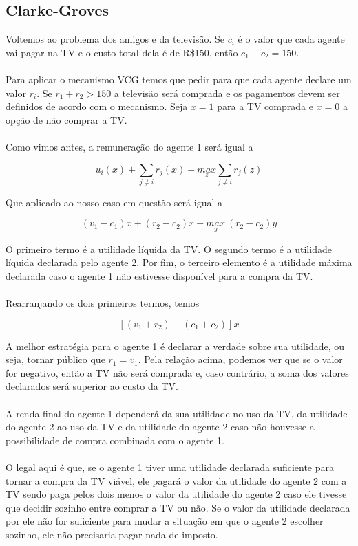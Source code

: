 \documentclass[a4paper,11pt,oneside]{book}
\theoremstyle{definition}
\theoremstyle{break}
\begin{document}
\subsection{Clarke-Groves}

Voltemos ao problema dos amigos e da televisão. Se $c_i$ é o valor que cada agente vai pagar na TV e o custo total dela é de R\$150, então $c_1 + c_2 = 150$.
\\~\\
Para aplicar o mecanismo VCG temos que pedir para que cada agente declare um valor $r_i$. Se $r_1 + r_2 > 150$ a televisão será comprada e os pagamentos devem ser definidos de acordo com o mecanismo. Seja $x=1$ para a TV comprada e $x=0$ a opção de não comprar a TV.
\\~\\
Como vimos antes, a remuneração do agente 1 será igual a 

$$ u_i(x) + \displaystyle \sum_{j \neq i} r_j(x) - \underset{z}{max} \sum_{j \neq i} r_j(z) $$

Que aplicado ao nosso caso em questão será igual a 

$$ (v_1 - c_1)x + (r_2 - c_2)x - \underset{y}{max}\ (r_2 - c_2)y $$

O primeiro termo é a utilidade líquida da TV. O segundo termo é a utilidade líquida declarada pelo agente 2. Por fim, o terceiro elemento é a utilidade máxima declarada caso o agente 1 não estivesse disponível para a compra da TV.
\\~\\
Rearranjando os dois primeiros termos, temos 

$$ [(v_1 + r_2) - (c_1 + c_2)]x $$

A melhor estratégia para o agente 1 é declarar a verdade sobre sua utilidade, ou seja, tornar público que $r_1 = v_1$. Pela relação acima, podemos ver que se o valor for negativo, então a TV não será comprada e, caso contrário, a soma dos valores declarados será superior ao custo da TV.
\\~\\
A renda final do agente 1 dependerá da sua utilidade no uso da TV, da utilidade do agente 2 ao uso da TV e da utilidade do agente 2 caso não houvesse a possibilidade de compra combinada com o agente 1.
\\~\\
O legal aqui é que, se o agente 1 tiver uma utilidade declarada suficiente para tornar a compra da TV viável, ele pagará o valor da utilidade do agente 2 com a TV sendo paga pelos dois menos o valor da utilidade do agente 2 caso ele tivesse que decidir sozinho entre comprar a TV ou não. Se o valor da utilidade declarada por ele não for suficiente para mudar a situação em que o agente 2 escolher sozinho, ele não precisaria pagar nada de imposto.
\end{document}
